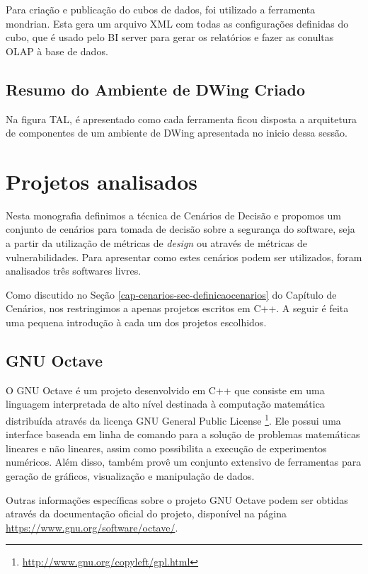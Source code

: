 Para criação e publicação do cubos de dados, foi utilizado a ferramenta mondrian. Esta gera um arquivo XML com todas as configurações definidas do cubo, que é usado pelo BI server para gerar os relatórios e fazer as conultas OLAP à base de dados.


\subsection{Resumo do Ambiente de DWing Criado}

Na figura TAL, é apresentado como cada ferramenta ficou disposta a arquitetura de componentes de um ambiente de DWing apresentada no inicio dessa sessão.



\section{Projetos analisados}
\label{cap-projects}

Nesta monografia definimos a técnica de Cenários de Decisão e propomos um conjunto de cenários para tomada de decisão sobre a segurança do software, seja a partir da utilização de métricas de \emph{design} ou através de métricas de vulnerabilidades. Para apresentar como estes cenários podem ser utilizados, foram analisados três softwares livres. 

Como discutido no Seção \ref{cap-cenarios-sec-definicaocenarios} do Capítulo de Cenários, nos restringimos a apenas projetos escritos em C++. A seguir é feita uma pequena introdução à cada um dos projetos escolhidos.

\subsection{GNU Octave}
\label{section-octave}

O GNU Octave é um projeto desenvolvido em C++ que consiste em uma linguagem interpretada de alto nível destinada à computação matemática distribuída através da licença GNU General Public License \footnote{\url{http://www.gnu.org/copyleft/gpl.html}}. Ele possui uma interface baseada em linha de comando para a solução de problemas matemáticas lineares e não lineares, assim como possibilita a execução de experimentos numéricos. Além disso, também provê um conjunto extensivo de ferramentas para geração de gráficos, visualização e manipulação de dados.

Outras informações específicas sobre o projeto GNU Octave podem ser obtidas através da documentação oficial do projeto, disponível na página \url{https://www.gnu.org/software/octave/}.

